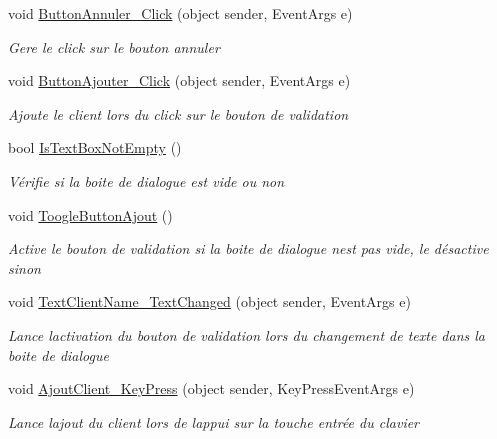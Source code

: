 \begin{DoxyCompactItemize}
\item 
void \mbox{\hyperlink{class_m_t_connect_agent_1_1_form_ajout_client_af93482854806707014064fc913d60a12}{Button\+Annuler\+\_\+\+Click}} (object sender, Event\+Args e)
\begin{DoxyCompactList}\small\item\em Gere le click sur le bouton annuler \end{DoxyCompactList}\item 
void \mbox{\hyperlink{class_m_t_connect_agent_1_1_form_ajout_client_a5671c25ddc79bac6a1418f653107875d}{Button\+Ajouter\+\_\+\+Click}} (object sender, Event\+Args e)
\begin{DoxyCompactList}\small\item\em Ajoute le client lors du click sur le bouton de validation \end{DoxyCompactList}\item 
bool \mbox{\hyperlink{class_m_t_connect_agent_1_1_form_ajout_client_a94aff4f5618a2775fc49a6b4e6e68502}{Is\+Text\+Box\+Not\+Empty}} ()
\begin{DoxyCompactList}\small\item\em Vérifie si la boite de dialogue est vide ou non \end{DoxyCompactList}\item 
void \mbox{\hyperlink{class_m_t_connect_agent_1_1_form_ajout_client_a7d4e9cad9fdcac1e9109661794bf4c38}{Toogle\+Button\+Ajout}} ()
\begin{DoxyCompactList}\small\item\em Active le bouton de validation si la boite de dialogue n\textquotesingle{}est pas vide, le désactive sinon \end{DoxyCompactList}\item 
void \mbox{\hyperlink{class_m_t_connect_agent_1_1_form_ajout_client_a0cf04c36ae8e2bc9c5d06d1fb72ad9a0}{Text\+Client\+Name\+\_\+\+Text\+Changed}} (object sender, Event\+Args e)
\begin{DoxyCompactList}\small\item\em Lance l\textquotesingle{}activation du bouton de validation lors du changement de texte dans la boite de dialogue \end{DoxyCompactList}\item 
void \mbox{\hyperlink{class_m_t_connect_agent_1_1_form_ajout_client_a29b901e29050d1e5cbe248e45af0b5e9}{Ajout\+Client\+\_\+\+Key\+Press}} (object sender, Key\+Press\+Event\+Args e)
\begin{DoxyCompactList}\small\item\em Lance l\textquotesingle{}ajout du client lors de l\textquotesingle{}appui sur la touche entrée du clavier \end{DoxyCompactList}\item 

\end{DoxyCompactItemize}
